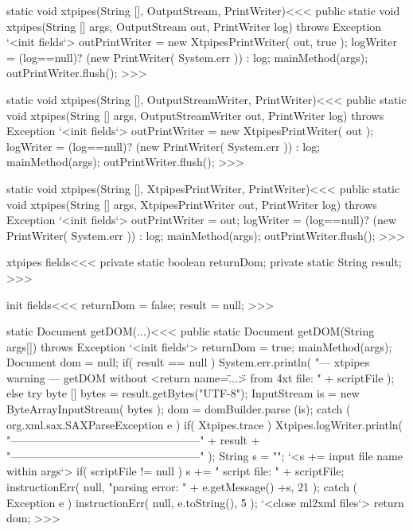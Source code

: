 \documentclass{article}
\begin{document}
{\<static void xtpipes(String [], OutputStream, PrintWriter)\><<<
public static void xtpipes(String [] args, 
                           OutputStream out,
                           PrintWriter log)
                                                throws Exception {
  `<init fields`>
  outPrintWriter = new XtpipesPrintWriter( out, true ); 
  logWriter = (log==null)? (new PrintWriter( System.err )) : log;
  mainMethod(args);
  outPrintWriter.flush();
}
>>>



\<static void xtpipes(String [], OutputStreamWriter, PrintWriter)\><<<
public static void xtpipes(String [] args, 
                           OutputStreamWriter out,
                           PrintWriter log)
                                                throws Exception {
  `<init fields`>
  outPrintWriter = new XtpipesPrintWriter( out ); 
  logWriter = (log==null)? (new PrintWriter( System.err )) : log;
  mainMethod(args);
  outPrintWriter.flush();
}
>>>

\<static void xtpipes(String [], XtpipesPrintWriter, PrintWriter)\><<<
public static void xtpipes(String [] args, 
                           XtpipesPrintWriter out,
                           PrintWriter log)
                                                throws Exception {
  `<init fields`>
  outPrintWriter = out; 
  logWriter = (log==null)? (new PrintWriter( System.err )) : log;
  mainMethod(args);
  outPrintWriter.flush();
}
>>>


\<xtpipes fields\><<<
private static boolean returnDom;
private static String result;
>>>

\<init fields\><<<
returnDom = false;
result = null;
>>>


\<static Document getDOM(...)\><<<
public static Document getDOM(String args[]) 
                               throws Exception {
  `<init fields`>
   returnDom = true;
   mainMethod(args);
   Document dom = null;
   if( result == null ){
     System.err.println(
       "--- xtpipes warning --- getDOM without <return name=\"...\"> from 4xt file: "
         + scriptFile );
   } else {
      try{
         byte [] bytes = result.getBytes("UTF-8");
         InputStream is =  new ByteArrayInputStream( bytes );
         dom = domBuilder.parse (is);
      } catch ( org.xml.sax.SAXParseException e ){
         if( Xtpipes.trace ){ 
            Xtpipes.logWriter.println( 
               "\n---------------------------------------------------\n"
                        + result +
               "\n---------------------------------------------------\n" ); 
         } 
         String s = "";
         `<s += input file name within args`>
         if( scriptFile != null ){ s += "    script file: " + scriptFile; }
         instructionErr( null,
            "parsing error: " + e.getMessage() +s, 21 );
      } catch ( Exception e ){
         instructionErr( null, e.toString(), 5 );
      }  
      `<close ml2xml files`>
   }
   return dom;
} 
>>>

}
\end{document}
